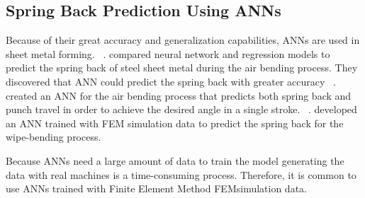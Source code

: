 \subsection*{Spring Back Prediction Using ANNs}

Because of their great accuracy and generalization capabilities, \ac{ANN}s are used in sheet metal forming.
~\cite[p. 2]{cruz_applicationmachinelearning_2021}.
\cite{narayanasamy_comparisonregressionartificial_2012a} compared neural network and regression models to predict the
spring back of steel sheet metal during the air bending process.
They discovered that ANN could predict the spring back with greater accuracy
~\cite[]{narayanasamy_comparisonregressionartificial_2012a}.
\cite{inamdar_developmentartificialneural_2000} created an ANN for the air bending process that
predicts both spring back and punch travel in
order to
achieve the desired angle in a single stroke.
~\cite{inamdar_developmentartificialneural_2000}.
\cite{kazan_predictionspringbackwipebending_2009} developed an ANN trained with FEM simulation data to predict the
spring back for the wipe-bending process.

Because \ac{ANN}s need a large amount of data to train the model generating the data
with real machines is a time-consuming process.
Therefore, it is common to use \ac{ANN}s trained with Finite Element Method \ac{FEM}simulation data.